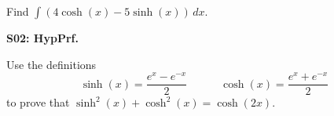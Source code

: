 \documentclass[12pt]{article}
\newcommand{\csch}{\operatorname{csch}}
\newcommand{\<}{\left\langle}
\renewcommand{\>}{\right\rangle}
\newcommand{\exerciseHeader}[4]{


  \vspace{0.5em}
  \textbf{#2}
  \vspace{0.5em}

}
\begin{document}
\begin{multicols}{2}
Find \(\int(4\cosh(x)-5\sinh(x))\,dx.\)


%
%

%

%

%
\exerciseHeader{2017 June 07}{S02: HypPrf.}{
Prove hyperbolic function identities.
}{1/3}

Use the definitions
\[
  \sinh(x)=\frac{e^x-e^{-x}}{2}
    \hspace{3em}
  \cosh(x)=\frac{e^x+e^{-x}}{2}
\]
to prove that \(\sinh^2(x)+\cosh^2(x)=\cosh(2x)\).




%

%

%

%

%


\end{multicols}
\end{document}
